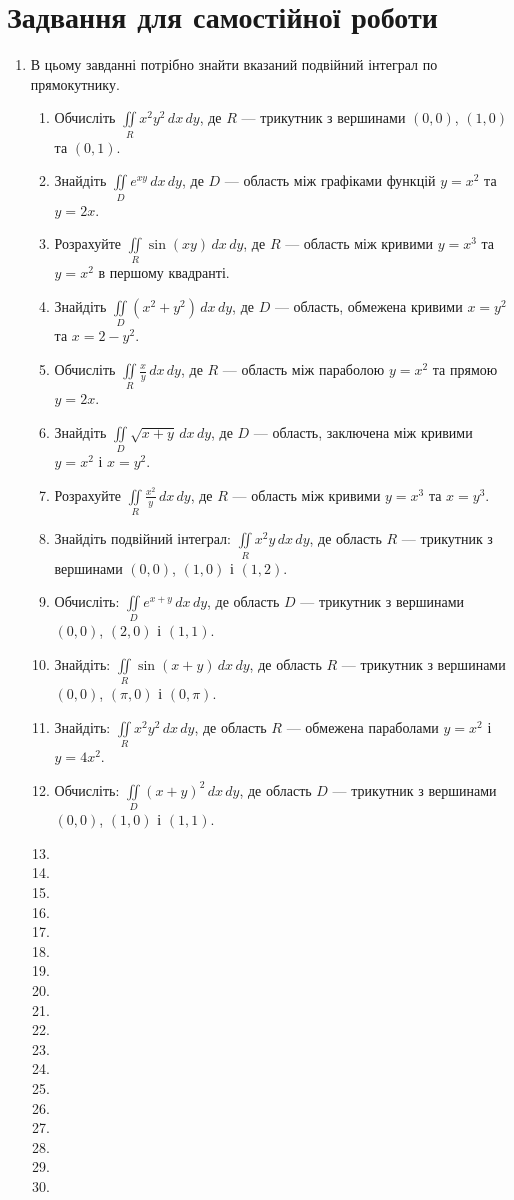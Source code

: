 \chapter{Задвання для самостійної роботи}
\begin{enumerate}
\item  В цьому завданні потрібно знайти вказаний подвійний інтеграл по прямокутнику.
\begin{enumerate}[label*=\arabic*.]
\item Обчисліть ${{\iint\limits_R x^2y^2 \,dx\,dy}}$, де ${{R}}$ --- трикутник з вершинами ${(0,0)}$, ${(1,0)}$ та ${(0,1)}$.
\item Знайдіть ${\iint\limits_D e^{xy} \,dx\,dy}$, де ${D}$ --- область між графіками функцій ${y = x^2}$ та ${y = 2x}$.
\item Розрахуйте ${\iint\limits_R \sin(xy) \,dx\,dy}$, де ${R}$ --- область між кривими ${y = x^3}$ та ${y = x^2}$ в першому квадранті.
\item Знайдіть ${\iint\limits_D (x^2 + y^2) \,dx\,dy}$, де ${D}$ --- область, обмежена кривими ${x = y^2}$ та ${x = 2-y^2}$.
\item Обчисліть ${\iint\limits_R \frac{x}{y} \,dx\,dy}$, де ${R}$ --- область між параболою ${y = x^2}$ та прямою ${y = 2x}$.
\item Знайдіть ${\iint\limits_D \sqrt{x+y} \,dx\,dy}$, де ${D}$ --- область, заключена між кривими ${y = x^2}$ і ${x = y^2}$.
\item Розрахуйте ${\iint\limits_R \frac{x^2}{y} \,dx\,dy}$, де ${R}$ --- область між кривими ${y = x^3}$ та ${x = y^3}$.
  \item Знайдіть подвійний інтеграл: $\iint\limits_R x^2y\,dx\,dy$, де область $R$ --- трикутник з вершинами $(0,0)$, $(1,0)$ і $(1,2)$.
  \item Обчисліть: $\iint\limits_D e^{x+y}\,dx\,dy$, де область $D$ --- трикутник з вершинами $(0,0)$, $(2,0)$ і $(1,1)$.
  \item Знайдіть: $\iint\limits_R \sin(x+y)\,dx\,dy$, де область $R$ --- трикутник з вершинами $(0,0)$, $(\pi,0)$ і $(0,\pi)$.
  \item Знайдіть: $\iint\limits_R x^2y^2\,dx\,dy$, де область $R$ --- обмежена параболами $y=x^2$ і $y=4x^2$.
  \item Обчисліть: $\iint\limits_D (x+y)^2\,dx\,dy$, де область $D$ --- трикутник з вершинами $(0,0)$, $(1,0)$ і $(1,1)$.
\item
\item
\item
\item
\item
\item
\item
\item
\item
\item
\item
\item
\item
\item
\item
\item
\item
\item
\end{enumerate}
\end{enumerate}
